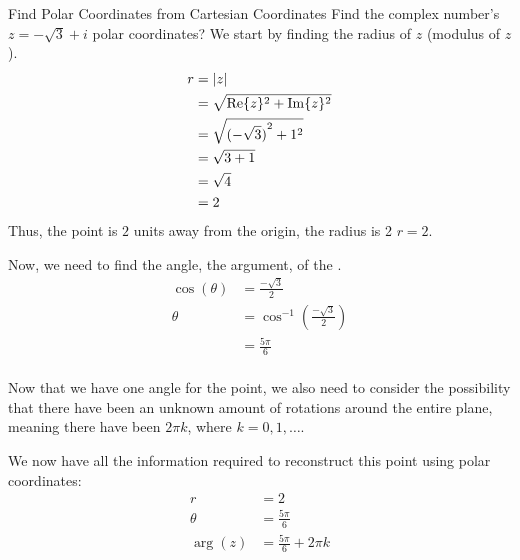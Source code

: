 \begin{example}{Find Polar Coordinates from Cartesian Coordinates}
  Find the complex number's $z = -\sqrt{3} + i$ polar coordinates?
  \tcblower{}
  We start by finding the radius of $z$ (modulus of $z$).
  \begin{align*}
    r &= \lvert z \rvert \\
      &= \sqrt{\operatorname{Re} \lbrace z \rbrace^{2} + \operatorname{Im} \lbrace z \rbrace^{2}} \\
      &= \sqrt{{(-\sqrt{3})}^{2} + 1^{2}} \\
      &= \sqrt{3 + 1} \\
      &= \sqrt{4} \\
      &= 2
  \end{align*}
  Thus, the point is $2$ units away from the origin, the radius is 2 $r=2$.

  Now, we need to find the angle, the argument, of the .
  \begin{align*}
    \cos(\theta) &= \frac{-\sqrt{3}}{2} \\
    \theta &= \cos^{-1} \left( \frac{-\sqrt{3}}{2} \right) \\
                 &= \frac{5 \pi}{6} \\
  \end{align*}

  Now that we have one angle for the point, we also need to consider the possibility that there have been an unknown amount of rotations around the entire plane, meaning there have been $2 \pi k$, where $k = 0, 1, \ldots$.

  We now have all the information required to reconstruct this point using polar coordinates:
  \begin{align*}
    r &= 2 \\
    \theta &= \frac{5 \pi}{6} \\
    \arg(z) &= \frac{5 \pi}{6} + 2\pi k
  \end{align*}
\end{example}


